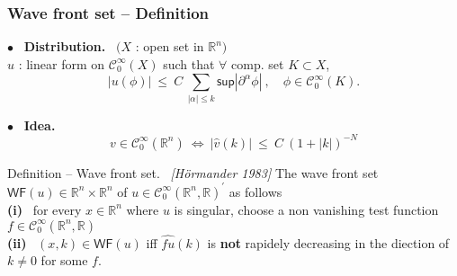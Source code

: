 \documentclass[9pt]{beamer}
\newcommand{\abs}[1]{\left|{#1}\right|}
\renewcommand{\sup}{\mathsf{sup}}
\newcommand{\WF}{\mathsf{WF}}
\newcommand{\citebeam}[1]{\textit{\textcolor{black!60!white}{[#1]}}}
\newcommand{\Ccal}{\mathcal{C}}
\newcommand{\Rbb}{\mathbb{R}}
\begin{document}

\begin{frame}

\frametitle{Wave front set -- Definition}

\vfill

$\bullet$ \ \textbf{Distribution.} \ $\big( X$ : open set in $\Rbb^n \big)$ \\
$u$ : linear form on $\Ccal^\infty_0(X)$ such that $\forall$ comp. set $K \subset X$,
\vspace*{-6pt}
\begin{equation*}
\abs{u(\phi)} \ \leq \ C \ \sum_{\abs{\alpha} \leq k} \sup\abs{\partial^\alpha \phi}   \ , \quad \phi \in \Ccal^\infty_0(K) .
\end{equation*}

\vfill

$\bullet$ \ \textbf{Idea.} 
\vspace*{-6pt}
\begin{equation*}
v \in \Ccal^\infty_0(\Rbb^n) \ \Leftrightarrow \ \abs{\hat{v}(k)} \ \leq \ C \ \left( 1 + \abs{k} \right)^{-N} 
\end{equation*}

\vfill

\begin{block}{Definition -- Wave front set. \ \citebeam{Hörmander 1983}}
 The wave front set $\WF(u) \in \Rbb^n \times \Rbb^n$ of $u \in \Ccal^\infty_0(\Rbb^n, \Rbb)^\prime$ as follows \\[2pt]
\qquad \textbf{(i)} \ for every $x \in \Rbb^n$ where $u$ is singular, choose a non vanishing test function $f \in \Ccal^\infty_0(\Rbb^n, \Rbb)$ \\[2pt]
\qquad \textbf{(ii)} \ $(x,k) \in \WF(u)$ iff $\hat{fu}(k)$ is \textbf{not} rapidely decreasing in the diection of $k \neq 0$ for some $f$.
\end{block}

\vfill

\end{frame}

\end{document}
